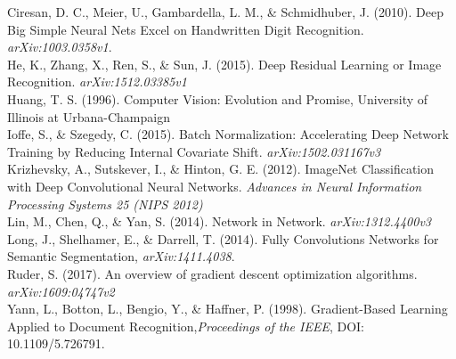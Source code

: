 \documentclass[a4paper]{article}
\begin{document}
Ciresan, D. C., Meier, U., Gambardella, L. M., \& Schmidhuber, J. (2010). Deep Big Simple Neural Nets Excel on Handwritten Digit Recognition. \textit{arXiv:1003.0358v1}.\\

He, K., Zhang, X., Ren, S., \& Sun, J. (2015). Deep Residual Learning or Image Recognition. \textit{arXiv:1512.03385v1}\\

Huang, T. S. (1996). Computer Vision: Evolution and Promise, University of Illinois at Urbana-Champaign\\

Ioffe, S., \& Szegedy, C. (2015). Batch Normalization: Accelerating Deep Network Training by Reducing Internal Covariate Shift. \textit{arXiv:1502.031167v3}\\

Krizhevsky, A., Sutskever, I., \& Hinton, G. E. (2012). ImageNet Classification with Deep Convolutional Neural Networks. \textit{Advances in Neural Information Processing Systems 25 (NIPS 2012)}\\

Lin, M., Chen, Q., \& Yan, S. (2014). Network in Network. \textit{arXiv:1312.4400v3}\\

Long, J., Shelhamer, E., \& Darrell, T. (2014). Fully Convolutions Networks for Semantic Segmentation, 	\textit{arXiv:1411.4038}.\\

Ruder, S. (2017). An overview of gradient descent optimization algorithms. \textit{arXiv:1609:04747v2}\\

Yann, L., Botton, L., Bengio, Y., \& Haffner, P. (1998). Gradient-Based Learning Applied to Document Recognition,\textit{Proceedings of the IEEE}, DOI: 10.1109/5.726791.\\
\end{document}
